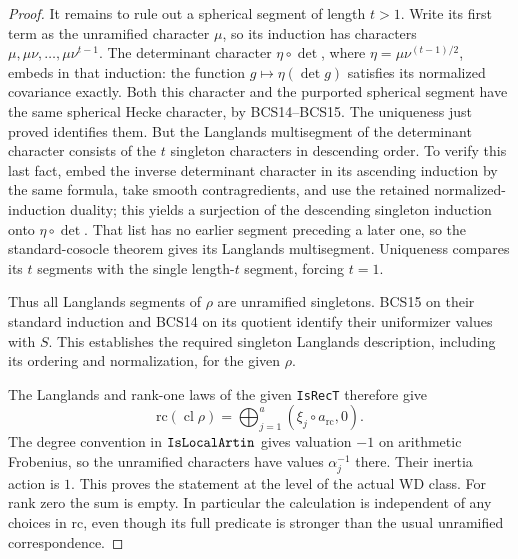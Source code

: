 \documentclass[11pt,a4paper]{article}
\numberwithin{equation}{section}
\theoremstyle{remark}\newtheorem{remark}[theorem]{Remark}
\begin{document}
\begin{proof}
It remains to rule out a spherical segment of length
$t>1$.  Write its first term as the unramified character
$\mu$, so its induction has characters
$\mu,\mu\nu,\ldots,\mu\nu^{t-1}$.  The determinant
character $\eta\circ\det$, where
$\eta=\mu\nu^{(t-1)/2}$, embeds in that induction:
the function $g\mapsto\eta(\det g)$ satisfies its
normalized covariance exactly.  Both this character
and the purported spherical segment have the same
spherical Hecke character, by BCS14--BCS15.  The
uniqueness just proved identifies them.  But the
Langlands multisegment of the determinant character
consists of the $t$ singleton characters in descending
order.  To verify this last fact, embed the inverse
determinant character in its ascending induction by
the same formula, take smooth contragredients, and use
the retained normalized-induction duality; this yields
a surjection of the descending singleton induction
onto $\eta\circ\det$.  That list has no earlier
segment preceding a later one, so the standard-cosocle
theorem gives its Langlands multisegment.  Uniqueness
compares its $t$ segments with the single length-$t$
segment, forcing $t=1$.

Thus all Langlands segments of $\rho$ are unramified
singletons.  BCS15 on their standard induction and
BCS14 on its quotient identify their uniformizer values
with $S$.  This establishes the required singleton
Langlands description, including its ordering and
normalization, for the given $\rho$.

The Langlands and rank-one laws of the given
\texttt{Is\allowbreak Rec\allowbreak T} therefore give
\[
          \mathrm{rc}(\operatorname{cl}\rho)
                     =\bigoplus_{j=1}^a(\xi_j\circ a_{\mathrm{rc}},0).
\]
The degree convention in $\texttt{Is\allowbreak Local\allowbreak Artin}$
gives valuation $-1$ on arithmetic Frobenius, so the
unramified characters have values $\alpha_j^{-1}$
there.  Their inertia action is $1$.  This proves
the statement at the level of the actual WD class.
For rank zero the sum is empty.  In particular the
calculation is independent of any choices in
$\mathrm{rc}$, even though its full predicate is
stronger than the usual unramified correspondence.
\end{proof}

\end{document}
